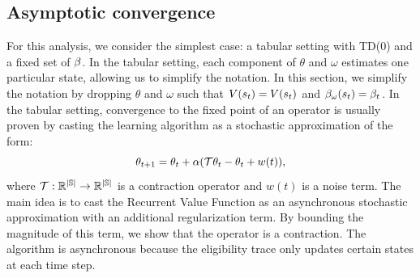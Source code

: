 \subsection{Asymptotic convergence}
For this analysis, we consider the simplest case: a tabular setting with TD(0) and a fixed set of $\beta$. In the tabular setting, each component of $\theta$ and $\omega$ estimates one particular state, allowing us to simplify the notation. In this section, we simplify the notation by dropping $\theta$ and $\omega$ such that $V(s_t) = V(s_t)$ and $\beta_{\omega}(s_t) = \beta_t$.
In the tabular setting, convergence to the fixed point of an operator is usually proven by casting the learning algorithm as a stochastic approximation \citep{tsitsiklis1994asynchronous,borkar2009stochastic,borkar2000ode} of the form:
\begin{equation}\label{stoch}
    \theta_{t+1} = \theta_t + \alpha( \mathcal{T} \theta_t  - \theta_t + w(t)), 
\end{equation}
where $\mathcal{T}: \mathbb{R^{|\mathbb{S}|}} \rightarrow \mathbb{R^{|\mathbb{S}|}}$ is a contraction operator and $w(t)$ is a noise term. 
The main idea is to cast the Recurrent Value Function as an asynchronous stochastic approximation \citep{tsitsiklis1994asynchronous} with an additional regularization term. By bounding the magnitude of this term, we show that the operator is a contraction. The algorithm is asynchronous because the eligibility trace only updates certain states at each time step. 

